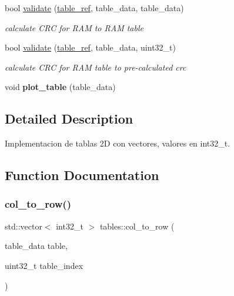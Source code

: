 \begin{DoxyCompactItemize}
\mbox{\label{namespacetables_a2663a4b36458007a02e8d2ddb20801f5}} 
bool \hyperlink{namespacetables_a2663a4b36458007a02e8d2ddb20801f5}{validate} (\hyperlink{structtable__ref}{table\+\_\+ref}, table\+\_\+data, table\+\_\+data)
\begin{DoxyCompactList}\small\item\em calculate C\+RC for R\+AM to R\+AM table \end{DoxyCompactList}\item 
\mbox{\label{namespacetables_a6152b4e661d9d371ed4580b80f5f9b80}} 
bool \hyperlink{namespacetables_a6152b4e661d9d371ed4580b80f5f9b80}{validate} (\hyperlink{structtable__ref}{table\+\_\+ref}, table\+\_\+data, uint32\+\_\+t)
\begin{DoxyCompactList}\small\item\em calculate C\+RC for R\+AM table to pre-\/calculated crc \end{DoxyCompactList}\item 
\mbox{\label{namespacetables_acfce212d9f061ab7df55e665ab89932b}} 
void {\bfseries plot\+\_\+table} (table\+\_\+data)
\end{DoxyCompactItemize}


\subsection{Detailed Description}
Implementacion de tablas 2D con vectores, valores en int32\+\_\+t. 

\subsection{Function Documentation}
\mbox{\label{namespacetables_af34bc025bc426995866a34ecbe393978}} 
\subsubsection{\texorpdfstring{col\+\_\+to\+\_\+row()}{col\_to\_row()}}
{\footnotesize\ttfamily std\+::vector$<$ int32\+\_\+t $>$ tables\+::col\+\_\+to\+\_\+row (\begin{DoxyParamCaption}\item[{table\+\_\+data}]{table,  }\item[{uint32\+\_\+t}]{table\+\_\+index }\end{DoxyParamCaption})}



